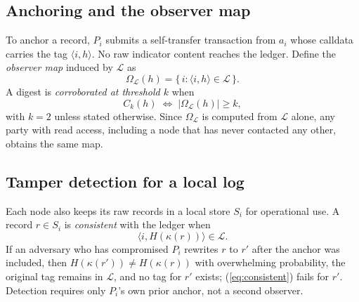 \documentclass[conference]{IEEEtran}
\newcommand{\Ledger}{\mathcal{L}}
\newcommand{\Obs}{\Omega}
\begin{document}
\subsection{Anchoring and the observer map}
To anchor a record, $P_i$ submits a self-transfer transaction from $a_i$ whose calldata carries the tag $\langle i,h\rangle$. No raw indicator content reaches the ledger. Define the \emph{observer map} induced by $\Ledger$ as
\begin{equation}
\Obs_\Ledger(h)=\{\,i : \langle i,h\rangle\in\Ledger\,\}.
\label{eq:omega}
\end{equation}
A digest is \emph{corroborated at threshold $k$} when
\begin{equation}
C_k(h)\;\Leftrightarrow\;|\Obs_\Ledger(h)|\ge k,
\label{eq:corr}
\end{equation}
with $k=2$ unless stated otherwise. Since $\Obs_\Ledger$ is computed from $\Ledger$ alone, any party with read access, including a node that has never contacted any other, obtains the same map.

\subsection{Tamper detection for a local log}
Each node also keeps its raw records in a local store $S_i$ for operational use. A record $r\in S_i$ is \emph{consistent} with the ledger when
\begin{equation}
\langle i, H(\kappa(r))\rangle\in\Ledger .
\label{eq:consistent}
\end{equation}
If an adversary who has compromised $P_i$ rewrites $r$ to $r'$ after the anchor was included, then $H(\kappa(r'))\ne H(\kappa(r))$ with overwhelming probability, the original tag remains in $\Ledger$, and no tag for $r'$ exists; (\ref{eq:consistent}) fails for $r'$. Detection requires only $P_i$'s own prior anchor, not a second observer.
\end{document}
